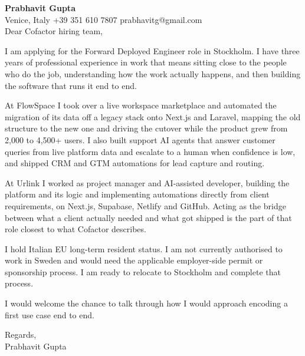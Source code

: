 \documentclass[a4paper,10.5pt]{article}
\begin{document}
\textbf{Prabhavit Gupta}\\
Venice, Italy \textbar{} +39 351 610 7807 \textbar{} prabhavitg@gmail.com\\[10pt]
Dear Cofactor hiring team,

I am applying for the Forward Deployed Engineer role in Stockholm. I have three years of professional experience in work that means sitting close to the people who do the job, understanding how the work actually happens, and then building the software that runs it end to end.

At FlowSpace I took over a live workspace marketplace and automated the migration of its data off a legacy stack onto Next.js and Laravel, mapping the old structure to the new one and driving the cutover while the product grew from 2,000 to 4,500+ users. I also built support AI agents that answer customer queries from live platform data and escalate to a human when confidence is low, and shipped CRM and GTM automations for lead capture and routing.

At Urlink I worked as project manager and AI-assisted developer, building the platform and its logic and implementing automations directly from client requirements, on Next.js, Supabase, Netlify and GitHub. Acting as the bridge between what a client actually needed and what got shipped is the part of that role closest to what Cofactor describes.

I hold Italian EU long-term resident status. I am not currently authorised to work in Sweden and would need the applicable employer-side permit or sponsorship process. I am ready to relocate to Stockholm and complete that process.

I would welcome the chance to talk through how I would approach encoding a first use case end to end.

Regards,\\
Prabhavit Gupta
\end{document}

